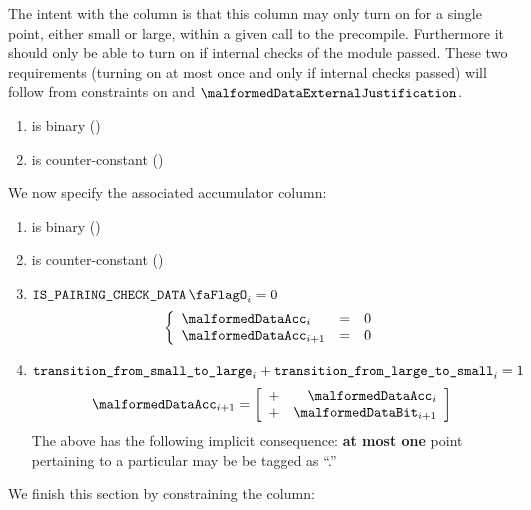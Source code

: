 The intent with the \malformedDataBit{} column is that this column may only turn on for a single point, either small or large, within a given call to the  precompile. Furthermore it should only be able to turn on if internal checks of the module passed.
These two requirements (turning on at most once and only if internal checks passed) will follow from constraints on \malformedDataAcc{} and $\malformedDataExternalJustification$.

\begin{enumerate}
    \item \malformedDataBit{} is binary \quad (\trash)
    \item \malformedDataBit{} is counter-constant \quad (\trash)
\end{enumerate}
We now specify the associated accumulator column:
\begin{enumerate}[resume]
    \item \malformedDataAcc{} is binary \quad (\trash)
    \item \malformedDataAcc{} is counter-constant \quad (\trash)
    \item \If $\isBlsPairingCheckData_{i} = 0$ \Then
          \[
              \left\{ \begin{array}{lcl}
                  \malformedDataAcc _{i}     & = & 0 \\
                  \malformedDataAcc _{i + 1} & = & 0 \\
              \end{array} \right.
          \]
    \item \If $\texttt{transition\_from\_small\_to\_large}_{i} + \texttt{transition\_from\_large\_to\_small}_{i} = 1$ \Then
          \[
              \malformedDataAcc _{i + 1} =
              \left[ \begin{array}{cr}
                      + & \malformedDataAcc _{i}     \\
                      + & \malformedDataBit    _{i + 1} \\
                  \end{array} \right]
          \]
          \saNote{} The above has the following implicit consequence: \textbf{at most one} point pertaining to a particular \blsId{} may be be tagged as ``\malformedDataBit.''
\end{enumerate}
We finish this section by constraining the \malformedDataExternalJustification{} column:
